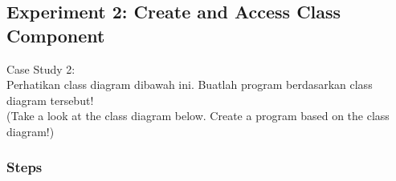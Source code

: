 \documentclass[12pt,titlepage]{article}
\begin{document}
\subsection{Experiment 2: Create and Access Class Component}
Case Study 2: \\

Perhatikan class diagram dibawah ini. Buatlah program berdasarkan class diagram tersebut! \\

(Take a look at the class diagram below. Create a program based on the class diagram!)

\begin{center}
\end{center}

\subsubsection*{Steps}
\end{document}

